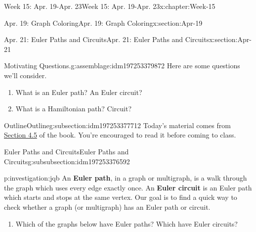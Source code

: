 \documentclass[oneside,10pt,]{book}
\newcommand{\terminology}[1]{\textbf{#1}}
\numberwithin{equation}{section}
\begin{document}
\begin{chapterptx}{Week 15: Apr. 19-Apr. 23}{}{Week 15: Apr. 19-Apr. 23}{}{}{x:chapter:Week-15}
\begin{sectionptx}{Apr. 19: Graph Coloring}{}{Apr. 19: Graph Coloring}{}{}{x:section:Apr-19}
\end{sectionptx}
%
%
\typeout{************************************************}
\typeout{************************************************}
%
\begin{sectionptx}{Apr. 21: Euler Paths and Circuits}{}{Apr. 21: Euler Paths and Circuits}{}{}{x:section:Apr-21}
\begin{introduction}{}%
\begin{assemblage}{Motivating Questions.}{g:assemblage:idm197253379872}%
Here are some questions we'll consider. %
\begin{enumerate}
\item{}What is an Euler path? An Euler circuit?%
\item{}What is a Hamiltonian path? Circuit?%
\end{enumerate}
%
\end{assemblage}
\end{introduction}%
%
%
\typeout{************************************************}
\typeout{************************************************}
%
\begin{subsectionptx}{Outline}{}{Outline}{}{}{g:subsection:idm197253377712}
Today's material comes from \href{http://discrete.openmathbooks.org/dmoi3/sec_paths.html}{Section 4.5} of the book. You're encouraged to read it before coming to class.%
%
%
\typeout{************************************************}
\typeout{************************************************}
%
\begin{subsubsectionptx}{Euler Paths and Circuits}{}{Euler Paths and Circuits}{}{}{g:subsubsection:idm197253376592}
%
%
%
%
%
%
%
%
%
%
%
\begin{investigation}{}{p:investigation:jqb}%
An \terminology{Euler path}, in a graph or multigraph, is a walk through the graph which uses every edge exactly once. An \terminology{Euler circuit} is an Euler path which starts and stops at the same vertex. Our goal is to find a quick way to check whether a graph (or multigraph) has an Euler path or circuit.%
\begin{enumerate}
\item{}Which of the graphs below have Euler paths? Which have Euler circuits?%

\end{enumerate}
\end{investigation}
\end{subsubsectionptx}
\end{subsectionptx}
\end{sectionptx}
\end{chapterptx}
\end{document}
